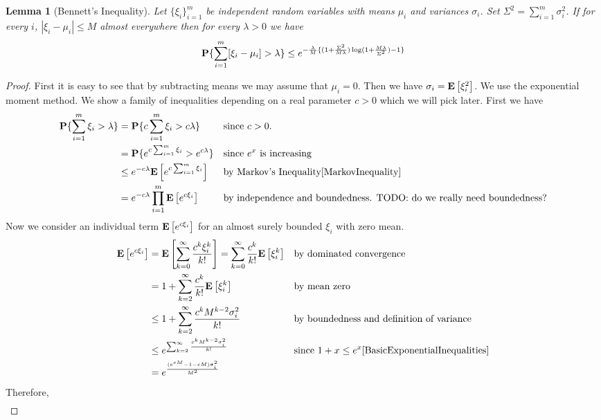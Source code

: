 \documentclass{amsart}
\newtheorem{lem}[thm]{Lemma}
\theoremstyle{remark}
\theoremstyle{definition}
\begin{document}
\begin{lem}[Bennett's Inequality]\label{Bennett} Let $\{\xi_i\}_{i=1}^m$ be independent random variables with means $\mu_i$ and variances $\sigma_i$.  Set $\Sigma^2 = \sum_{i=1}^m \sigma_i^2$.  If for every $i$, $|\xi_i - \mu_i| \leq M$ almost everywhere then for every $\lambda > 0$ we have $$
\textbf{P}\{\sum_{i=1}^m [\xi_i - \mu_i] > \lambda\} \leq 
e^{
	-\frac{\lambda}{M}\{(1 + \frac{\Sigma^2}{M\lambda})\log(1+\frac{M\lambda}{\Sigma^2}) - 1\}
}
$$
\end{lem}
\begin{proof}
First it is easy to see that by subtracting means we may assume that
$\mu_i=0$.  Then we have $\sigma_i = \textbf{E}\left[\xi_i^2\right]$.  We use
the exponential moment method.  We show a family of inequalities
depending on a real parameter $c > 0$ which we will pick later.  First we have 
\begin{align*}
\textbf{P}\{\sum_{i=1}^m \xi_i > \lambda\} & =
\textbf{P}\{c\sum_{i=1}^m \xi_i > c\lambda\}  && \textrm{since } c >0.\\
  & =\textbf{P}\{e^{c\sum_{i=1}^m \xi_i} > e^{c\lambda}\} &&
  \textrm{since } e^x \textrm{ is increasing}\\
  & \leq e^{-c\lambda} \textbf{E}\left[e^{c\sum_{i=1}^m \xi_i}\right] && \textrm
  {by Markov's Inequality}\eqref{MarkovInequality}\\
  & = e^{-c\lambda} \prod_{i=1}^m \textbf{E}\left[e^{c\xi_i}\right] &&
  \textrm{by independence and boundedness.  TODO: do we really need boundedness?}
\end{align*}
Now we consider an individual term $\textbf{E}\left[e^{c\xi_i}\right]$ for an
almost surely bounded $\xi_i$ with zero mean.
\begin{align*}
\textbf{E}\left[e^{c\xi_i}\right] &= \textbf{E}\left[\sum_{k=0}^\infty
  \frac{c^k\xi_i^k}{k!}\right] = \sum_{k=0}^\infty
  \frac{c^k}{k!}\textbf{E}\left[\xi_i^k\right] && \textrm{by dominated
    convergence} \\
& = 1  + \sum_{k=2}^\infty
  \frac{c^k}{k!}\textbf{E}\left[\xi_i^k\right] && \textrm{by mean zero} \\
& \leq 1  + \sum_{k=2}^\infty
  \frac{c^k M^{k-2} \sigma_i^2}{k!} && \textrm{by boundedness and
    definition of variance} \\
& \leq e^{\sum_{k=2}^\infty  \frac{c^k M^{k-2} \sigma_i^2}{k!}} &&
\textrm{since } 1+x \leq e^x \eqref{BasicExponentialInequalities} \\
& = e^{\frac{(e^{cM} -1 - cM)\sigma_i^2}{M^2}}
\end{align*}
Therefore,
\begin{align*}

\end{align*}
\end{proof}
\end{document}
